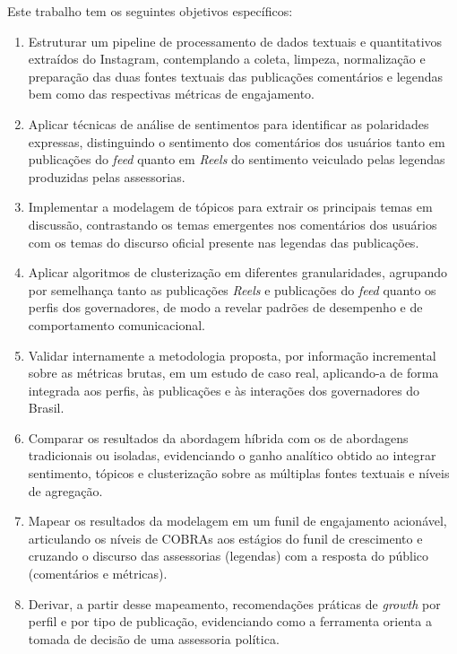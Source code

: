 Este trabalho tem os seguintes objetivos específicos:

\begin{enumerate}
    \item Estruturar um pipeline de processamento de dados textuais e quantitativos extraídos do Instagram, contemplando a coleta, limpeza, normalização e preparação das duas fontes textuais das publicações \textemdash{} comentários e legendas \textemdash{} bem como das respectivas métricas de engajamento.

    \item Aplicar técnicas de análise de sentimentos para identificar as polaridades expressas, distinguindo o sentimento dos comentários dos usuários \textemdash{} tanto em publicações do \emph{feed} quanto em \emph{Reels} \textemdash{} do sentimento veiculado pelas legendas produzidas pelas assessorias.

    \item Implementar a modelagem de tópicos para extrair os principais temas em discussão, contrastando os temas emergentes nos comentários dos usuários com os temas do discurso oficial presente nas legendas das publicações.

    \item Aplicar algoritmos de clusterização em diferentes granularidades, agrupando por semelhança tanto as publicações \textemdash{} \emph{Reels} e publicações do \emph{feed} \textemdash{} quanto os perfis dos governadores, de modo a revelar padrões de desempenho e de comportamento comunicacional.

    \item Validar internamente a metodologia proposta, por informação incremental sobre as métricas brutas, em um estudo de caso real, aplicando-a de forma integrada aos perfis, às publicações e às interações dos governadores do Brasil.

    \item Comparar os resultados da abordagem híbrida com os de abordagens tradicionais ou isoladas, evidenciando o ganho analítico obtido ao integrar sentimento, tópicos e clusterização sobre as múltiplas fontes textuais e níveis de agregação.

    \item Mapear os resultados da modelagem em um funil de engajamento acionável, articulando os níveis de COBRAs aos estágios do funil de crescimento e cruzando o discurso das assessorias (legendas) com a resposta do público (comentários e métricas).

    \item Derivar, a partir desse mapeamento, recomendações práticas de \emph{growth} por perfil e por tipo de publicação, evidenciando como a ferramenta orienta a tomada de decisão de uma assessoria política.
\end{enumerate}





